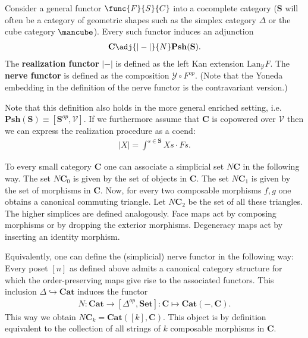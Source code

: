    \begin{construct}
        Consider a general functor $\func{F}{S}{C}$ into a cocomplete category ($\mathbf{S}$ will often be a category of geometric shapes such as the simplex category $\Delta$ or the cube category $\mbox{\mancube}$). Every such functor induces an adjunction
        \begin{gather}
            \mathbf{C}\adj{|-|}{N}\mathbf{Psh}(\mathbf{S}).
        \end{gather}
        The \textbf{realization functor} $|-|$ is defined as the left Kan extension $\text{Lan}_{\mathcal{Y}}F$. The \textbf{nerve functor} is defined as the composition $\mathcal{Y}\circ F^{op}$. (Note that the Yoneda embedding in the definition of the nerve functor is the contravariant version.)

        Note that this definition also holds in the more general enriched setting, i.e. $\mathbf{Psh}(\mathbf{S})\equiv[\mathbf{S}^{op}, \mathcal{V}]$. If we furthermore assume that $\mathbf{C}$ is copowered over $\mathcal{V}$ then we can express the realization procedure as a coend:
        \begin{gather}
            |X| = \int^{s\in\mathbf{S}}Xs\cdot Fs.
        \end{gather}
    \end{construct}

    \begin{example}[Nerve]
        To every small category \textbf{C} one can associate a simplicial set $N\mathbf{C}$ in the following way. The set $N\mathbf{C}_0$ is given by the set of objects in $\mathbf{C}$. The set $N\mathbf{C}_1$ is given by the set of morphisms in $\mathbf{C}$. Now, for every two composable morphisms $f, g$ one obtains a canonical commuting triangle. Let $N\mathbf{C}_2$ be the set of all these triangles. The higher simplices are defined analogously. Face maps act by composing morphisms or by dropping the exterior morphisms. Degeneracy maps act by inserting an identity morphism.

        Equivalently, one can define the (simplicial) nerve functor in the following way: Every poset $[n]$ as defined above admits a canonical category structure for which the order-preserving maps give rise to the associated functors. This inclusion $\Delta\hookrightarrow\mathbf{Cat}$ induces the functor
        \begin{gather}
            N:\textbf{Cat}\rightarrow[\Delta^{op}, \textbf{Set}]:\mathbf{C}\mapsto\mathbf{Cat}(-, \mathbf{C}).
        \end{gather}
        This way we obtain $N\mathbf{C}_k=\mathbf{Cat}([k], \mathbf{C})$. This object is by definition equivalent to the collection of all strings of $k$ composable morphisms in $\mathbf{C}$.
    \end{example}

